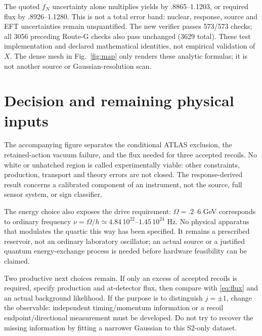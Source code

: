 \documentclass[11pt,a4paper]{article}
\begin{document}
The quoted $f_N$ uncertainty alone multiplies yields by .8865--1.1203,
or required flux by .8926--1.1280. This is not a total error band:
nuclear, response, source and EFT uncertainties remain unquantified.
The new verifier passes 573/573 checks; all 3056 preceding Route-G
checks also pass unchanged (3629 total). These test implementation
and declared mathematical identities, not empirical validation of $X$.
The dense mesh in Fig.~\ref{fig:map} only renders these analytic
formulas; it is not another source or Gaussian-resolution scan.

\section{Decision and remaining physical inputs}
The accompanying figure separates the conditional ATLAS exclusion,
the retained-action vacuum failure, and the flux needed for three
accepted recoils. No white or unhatched region is called experimentally
viable: other constraints, production, transport and theory errors are
not closed. The response-derived result concerns a calibrated component
of an instrument, not the source, full sensor system, or sign classifier.

The energy choice also exposes the drive requirement:
$\Omega=.2$--6 GeV corresponds to ordinary frequency
$\nu=\Omega/h\simeq4.84\,10^{22}$--$1.45\,10^{24}$ Hz.
No physical apparatus that modulates the quartic this way has been
specified. It remains a prescribed reservoir, not an ordinary laboratory
oscillator; an actual source or a justified quantum energy-exchange
process is needed before hardware feasibility can be claimed.

Two productive next choices remain. If only an excess of accepted
recoils is required, specify production and at-detector flux, then
compare with \eqref{eq:flux} and an actual background likelihood.
If the purpose is to distinguish $j=\pm1$, change the observable:
independent timing/momentum information or a recoil endpoint/directional
measurement must be developed. Do not try to recover the missing
information by fitting a narrower Gaussian to this S2-only dataset.
\end{document}
